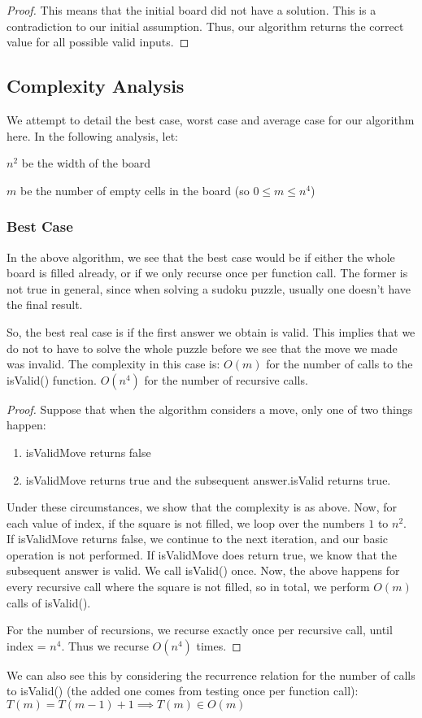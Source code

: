 \documentclass[16pt]{article}
\begin{document}
\begin{proof}
This means that the initial board did not have a solution. This is a contradiction to our initial assumption.
Thus, our algorithm returns the correct value for all possible valid inputs.
\end{proof}
\subsection{Complexity Analysis}
We attempt to detail the best case, worst case and average case for our algorithm here.
In the following analysis, let:

$n^2$ be the width of the board

$m$ be the number of empty cells in the board (so $0 \leq m \leq n^4$)


\subsubsection*{Best Case}
In the above algorithm, we see that the best case would be if either the whole board is filled already, or if we only recurse once per function call.
The former is not true in general, since when solving a sudoku puzzle, usually one doesn't have the final result.

So, the best real case is if the first answer we obtain is valid.
This implies that we do not to have to solve the whole puzzle before we see that the move we made was invalid.
The complexity in this case is: 
\newline
$O(m)$ for the number of calls to the isValid() function.
\newline
$O(n^4)$ for the number of recursive calls.
\begin{proof}
    Suppose that when the algorithm considers a move, only one of two things happen:
    \begin{enumerate}
        \item isValidMove returns false
        \item isValidMove returns true and the subsequent answer.isValid returns true.
    \end{enumerate}

    Under these circumstances, we show that the complexity is as above.
    \newline
    Now, for each value of index, if the square is not filled, we loop over the numbers $1$ to $n^2$. If isValidMove returns false, we continue to the next iteration, and our basic operation is not performed.
    \newline
    If isValidMove does return true, we know that the subsequent answer is valid. We call isValid() once.
    \newline
    Now, the above happens for every recursive call where the square is not filled, so in total, we perform $O(m)$ calls of isValid().

    For the number of recursions, we recurse exactly once per recursive call, until index = $n^4$. Thus we recurse $O(n^4)$ times.
\end{proof}
We can also see this by considering the recurrence relation for the number of calls to isValid() (the added one comes from testing once per function call):
\newline
$T(m) = T(m-1) + 1 \implies T(m) \in O(m)$
\end{document}
